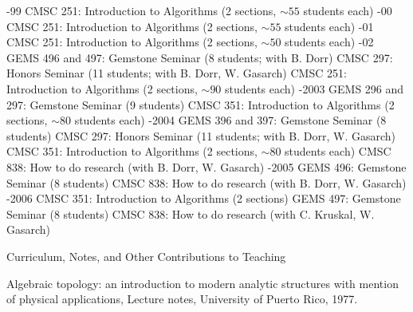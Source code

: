 {{%

-99
\quad CMSC 251: Introduction to Algorithms (2 sections, $\sim 55$ students each)
-00
\quad CMSC 251: Introduction to Algorithms (2 sections, $\sim 55$ students each)
-01
\quad CMSC 251: Introduction to Algorithms (2 sections, $\sim 50$ students each)
-02
\quad GEMS 496 and 497: Gemstone Seminar (8 students; with B. Dorr)
\quad CMSC 297: Honors Seminar (11 students; with B. Dorr, W. Gasarch)
\quad CMSC 251: Introduction to Algorithms (2 sections, $\sim 90$ students each)
-2003
\quad GEMS 296 and 297: Gemstone Seminar (9 students)
\quad CMSC 351: Introduction to Algorithms (2 sections, $\sim 80$ students each)
-2004
\quad GEMS 396 and 397: Gemstone Seminar (8 students)
\quad CMSC 297: Honors Seminar (11 students; with B. Dorr, W. Gasarch)
\quad CMSC 351: Introduction to Algorithms (2 sections, $\sim 80$ students each)
\quad CMSC 838: How to do research (with B. Dorr, W. Gasarch)
-2005
\quad GEMS 496: Gemstone Seminar (8 students)
\quad CMSC 838: How to do research (with B. Dorr, W. Gasarch)
-2006
\quad CMSC 351: Introduction to Algorithms (2 sections)
\quad GEMS 497: Gemstone Seminar (8 students)
\quad CMSC 838: How to do research (with C. Kruskal, W. Gasarch)
}

\subsec Curriculum, Notes, and Other Contributions to Teaching

\paper
Algebraic topology:  an introduction to modern analytic structures with
mention of physical applications, 
Lecture  notes,  University  of  Puerto
Rico, 1977.

}
